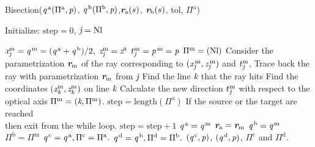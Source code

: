 \begin{algorithm}
\caption{Bisection($\textit{q}^{\,\textrm{a}}(\Pi^{\textrm{a}}, \textit{p})$, $\textit{q}^{\,\textrm{b}}(\Pi^{\textrm{b}}, \textit{p})$,$\textit{\textbf{r}}_{\textrm{a}}(s)$, $\textit{\textbf{r}}_{\textrm{b}}(s)$, \textrm{tol}, $\Pi^\textrm{a}$)}\label{alg:bisection}
Initialize: $\textrm{step} = 0$, $\textit{j} = \textrm{Nl}$
\begin{algorithmic}[1]
\State $\textit{x}_{\textit{j}}^{\textrm{m}}=\textit{q}^{\,\textrm{m}}= (\textit{q}^{\,\textrm{a}}+\textit{q}^{\,\textrm{b}})/2,$ 
\State $\textit{z}_{\textit{j}}^{\textrm{m}}= \textit{z}^{\textrm{a}}$
\State $t_{\textit{j}}^{\textrm{m}}=\textit{p}^{\,\textrm{m}}=\textit{p}$
\State $\Pi^{\textrm{m}}= (\textrm{Nl})$
\State Consider the parametrization $\textit{\textbf{r}}_{\textrm{m}}$ of the ray corresponding to $(\textit{x}_{\textit{j}}^{\,\textrm{m}}, \textit{z}_{\textit{j}}^{\,\textrm{m}})$ and $t_{\textit{j}}^{\textrm{m}}$,
\State Trace back the ray with parametrization $\textit{\textbf{r}}_{\textrm{m}}$ from $\textit{j}$
\State Find the line $\textit{k}$ that the ray hits 
\State Find the coordinates $(\textit{x}^{\textrm{m}}_{\textit{k}}, \textit{z}^{\textrm{m}}_{\textit{k}})$ on line $\textit{k}$
\State Calculate the new direction $t_{\textit{j}}^{\textrm{m}}$ with respect to the optical axis
\State $\Pi^{\textrm{m}}=(\textit{k},\Pi^{\textrm{m}})$.
\State $\textrm{step} = \mbox{length}(\Pi^\textrm{a})$ \Comment If the source or the target are reached \\  \Comment then exit from the while loop.
\Else \State $\textrm{step}=\textrm{step}+1$ 
\EndIf
\EndWhile
{}
\State $\textit{q}^{\,\textrm{a}}= \textit{q}^{\,\textrm{m}}$
\State $\textit{\textbf{r}}_{\textrm{a}}= \textit{\textbf{r}}_{\textrm{m}}$
\Else 
\State $\textit{q}^{\,\textrm{b}}= \textit{q}^{\,\textrm{m}}$
\State $\Pi^\textrm{b} =  \Pi^{\textrm{m}}$
\EndIf
\EndWhile
\State $\textit{q}^{\,\textrm{c}}= \textit{q}^{\,\textrm{a}}, \Pi^\textrm{c}= \Pi^{\textrm{a}}.$
\State $\textit{q}^{\,\textrm{d}}= \textit{q}^{\,\textrm{b}}, \Pi^\textrm{d}= \Pi^{\textrm{b}}.$
\State \Return $(\textit{q}^{\,\textrm{c}}, \textit{p})$, $(\textit{q}^{\,\textrm{d}}, \textit{p})$, $\Pi^{\textrm{c}}$ and $\Pi^{\textrm{d}}$.
\end{algorithmic}
\end{algorithm}
